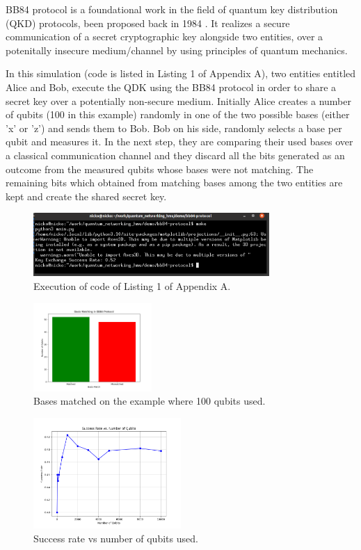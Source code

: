 \documentclass[12pt,a4paper] {report}
\begin{document}
		BB84 protocol is a foundational work in the field
		of quantum key distribution (QKD) protocols,
		been proposed back in 1984 \cite{bb84}.
		It realizes a secure communication of a secret cryptographic key
		alongside two entities, over a potenitally insecure medium/channel
		by using principles of quantum mechanics.
		
		In this simulation (code is listed in Listing 1 of Appendix A),
		two entities entitled Alice and Bob, execute the QDK using the BB84 protocol
		in order to share a secret key over a potentially non-secure medium. Initially Alice creates
		a number of qubits (100 in this example) randomly in one of the two possible bases (either 'x' or 'z') and sends them 
		to Bob. Bob on his side, randomly selects a base per qubit and measures it. In the next step, 
		they are comparing their used bases over a classical communication channel and 
		they discard all the bits generated as an outcome from the measured qubits whose bases were not matching.
		The remaining bits which obtained from matching bases among the two entities are kept and create the shared secret key.

		\begin{figure}[h!]
			\centering
			\includegraphics[width=0.8\textwidth]{bb84/success_rate_terminal.png}
			\caption{Execution of code of Listing 1 of Appendix A.}
			\label{fig:}
		\end{figure}		

		\begin{figure}[h!]
			\centering
			\includegraphics[width=0.4\textwidth]{bb84/basis_matching.png}
			\caption{Bases matched on the example where 100 qubits used.}
			\label{fig:}
		\end{figure}		


		\begin{figure}[h!]
			\centering
			\includegraphics[width=0.5\textwidth]{bb84/success_rate_vs_num_qubits.png}
			\caption{Success rate vs number of qubits used.}
			\label{fig:}
		\end{figure}		
	
\end{document}
